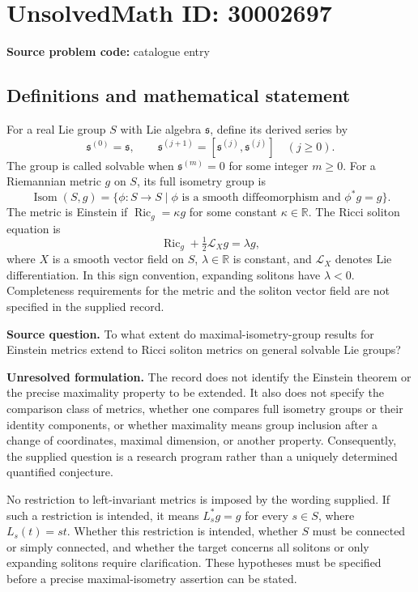 \documentclass[11pt]{article}
\newcommand{\R}{\mathbb{R}}
\begin{document}
\section*{UnsolvedMath ID: 30002697}
\textbf{Source problem code:} catalogue entry
\subsection{Definitions and mathematical statement}
For a real Lie group \(S\) with Lie algebra \(\mathfrak{s}\), define its derived series by
\[
\mathfrak{s}^{(0)}=\mathfrak{s},\qquad
\mathfrak{s}^{(j+1)}=[\mathfrak{s}^{(j)},\mathfrak{s}^{(j)}]\quad(j\geq 0).
\]
The group is called solvable when \(\mathfrak{s}^{(m)}=0\) for some integer \(m\geq 0\). For a Riemannian metric \(g\) on \(S\), its full isometry group is
\[
\operatorname{Isom}(S,g)=\{\phi:S\to S\mid \phi\text{ is a smooth diffeomorphism and }\phi^*g=g\}.
\]
The metric is Einstein if \(\operatorname{Ric}_g=\kappa g\) for some constant \(\kappa\in\R\). The Ricci soliton equation is
\[
\operatorname{Ric}_g+\tfrac12\mathcal{L}_Xg=\lambda g,
\]
where \(X\) is a smooth vector field on \(S\), \(\lambda\in\R\) is constant, and \(\mathcal{L}_X\) denotes Lie differentiation. In this sign convention, expanding solitons have \(\lambda<0\). Completeness requirements for the metric and the soliton vector field are not specified in the supplied record.

\textbf{Source question.} To what extent do maximal-isometry-group results for Einstein metrics extend to Ricci soliton metrics on general solvable Lie groups?

\textbf{Unresolved formulation.} The record does not identify the Einstein theorem or the precise maximality property to be extended. It also does not specify the comparison class of metrics, whether one compares full isometry groups or their identity components, or whether maximality means group inclusion after a change of coordinates, maximal dimension, or another property. Consequently, the supplied question is a research program rather than a uniquely determined quantified conjecture.

No restriction to left-invariant metrics is imposed by the wording supplied. If such a restriction is intended, it means \(L_s^*g=g\) for every \(s\in S\), where \(L_s(t)=st\). Whether this restriction is intended, whether \(S\) must be connected or simply connected, and whether the target concerns all solitons or only expanding solitons require clarification. These hypotheses must be specified before a precise maximal-isometry assertion can be stated.
\end{document}
